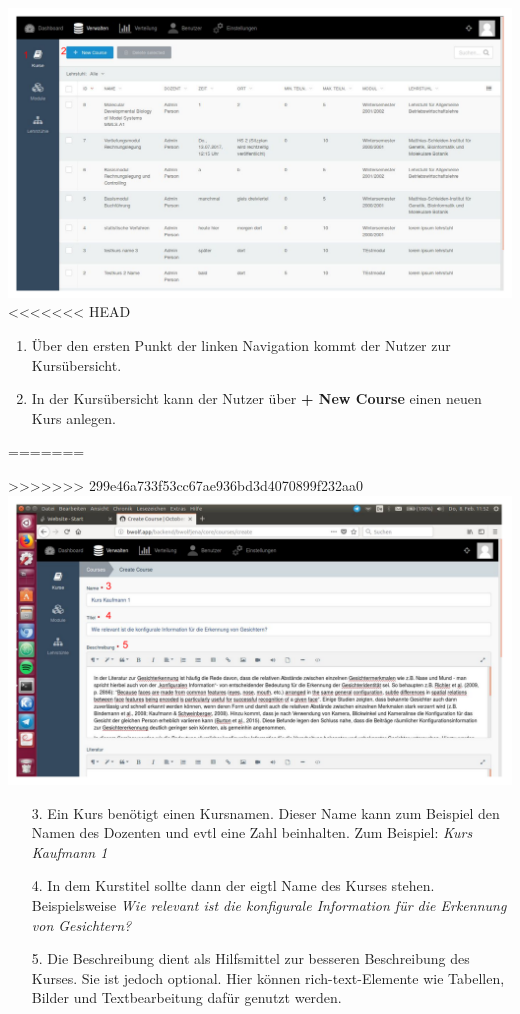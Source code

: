     \includegraphics[scale=0.3]{backend/img/verwalten_kurse.pdf}
<<<<<<< HEAD
    \begin{enumerate}
     \item Über den ersten Punkt der linken Navigation kommt der Nutzer zur Kursübersicht.
     \item In der Kursübersicht kann der Nutzer über \textbf{+ New Course} einen neuen Kurs anlegen. 
    \end{enumerate}
    
=======

>>>>>>> 299e46a733f53cc67ae936bd3d4070899f232aa0
    \includegraphics[scale=0.3]{backend/img/create_course_1.pdf}
    \begin{enumerate}
     \item[3.] Ein Kurs benötigt einen Kursnamen. Dieser Name kann zum Beispiel den Namen des Dozenten und evtl eine Zahl beinhalten. Zum Beispiel: \textit{Kurs Kaufmann 1}
     \item[4.] In dem Kurstitel sollte dann der eigtl Name des Kurses stehen. Beispielsweise \textit{Wie relevant ist die konfigurale Information für die Erkennung von Gesichtern?}
     \item[5.] Die Beschreibung dient als Hilfsmittel zur besseren Beschreibung des Kurses. Sie ist jedoch optional.
	       Hier können rich-text-Elemente wie Tabellen, Bilder und Textbearbeitung dafür genutzt werden.
    \end{enumerate}

